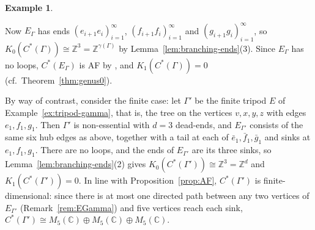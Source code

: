 \documentclass[12pt,reqno]{amsart}
\theoremstyle{plain}
\theoremstyle{definition}
\newtheorem{example}[theorem]{Example}
\newcommand{\Z}{\mathbb{Z}}
\begin{document}
\begin{example}
\begin{center}
\end{center}
Now $E_\Gamma$ has ends $(e_{i+1}e_i)_{i=1}^{\infty}$, $(f_{i+1}f_i)_{i=1}^{\infty}$ and
$(g_{i+1}g_i)_{i=1}^{\infty}$, so $K_0(C^*(\Gamma))\cong\Z^{3}=\Z^{\gamma(\Gamma)}$ by
Lemma~\ref{lem:branching-ends}(3). Since $E_\Gamma$ has no loops, $C^*(E_\Gamma)$ is AF by
\cite[Theorem~2.4]{KPR}, and $K_1(C^*(\Gamma))=0$ \textup(cf.\ Theorem~\ref{thm:genus0}\textup).

By way of contrast, consider the finite case: let $\Gamma'$ be the finite tripod $E$ of
Example~\ref{ex:tripod-gamma}, that is, the tree on the vertices $v,x,y,z$ with edges
$e_1,f_1,g_1$. Then $\Gamma'$ is non-essential with $d=3$ dead-ends, and $E_{\Gamma'}$ consists of
the same six hub edges as above, together with a tail at each of $\bar e_1,\bar f_1,\bar g_1$ and
sinks at $e_1,f_1,g_1$. There are no loops, and the ends of $E_{\Gamma'}$ are its three sinks, so
Lemma~\ref{lem:branching-ends}(2) gives $K_0(C^*(\Gamma'))\cong\Z^{3}=\Z^{d}$ and
$K_1(C^*(\Gamma'))=0$. In line with Proposition~\ref{prop:AF}, $C^*(\Gamma')$ is
finite-dimensional: since there is at most one directed path between any two vertices of
$E_{\Gamma'}$ \textup(Remark~\ref{rem:EGamma}\textup) and five vertices reach each sink,
$C^*(\Gamma')\cong M_5(\mathbb{C})\oplus M_5(\mathbb{C})\oplus M_5(\mathbb{C})$.
\end{example}
\end{document}
